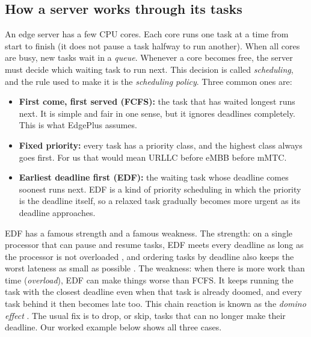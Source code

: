 \documentclass[11pt]{article}
\theoremstyle{definition}
\begin{document}
\subsection{How a server works through its tasks}
An edge server has a few CPU cores. Each core runs one task at a time from start to finish (it does not pause a
task halfway to run another). When all cores are busy, new tasks wait in a \emph{queue}. Whenever a core becomes
free, the server must decide which waiting task to run next. This decision is called \emph{scheduling}, and the
rule used to make it is the \emph{scheduling policy}. Three common ones are:
\begin{itemize}
\item \textbf{First come, first served (FCFS):} the task that has waited longest runs next. It is simple and
fair in one sense, but it ignores deadlines completely. This is what EdgePlus assumes.
\item \textbf{Fixed priority:} every task has a priority class, and the highest class always goes first. For us
that would mean URLLC before eMBB before mMTC.
\item \textbf{Earliest deadline first (EDF):} the waiting task whose deadline comes soonest runs next. EDF is a
kind of priority scheduling in which the priority is the deadline itself, so a relaxed task gradually becomes
more urgent as its deadline approaches.
\end{itemize}

EDF has a famous strength and a famous weakness. The strength: on a single processor that can pause and resume tasks, EDF
meets every deadline as long as the processor is not overloaded \cite{liu1973}, and ordering tasks by deadline also
keeps the worst lateness as small as possible \cite{jackson1955}. The weakness: when there is more work than time
(\emph{overload}), EDF can make things worse than FCFS. It keeps running the task with the closest deadline even
when that task is already doomed, and every task behind it then becomes late too. This chain reaction is known
as the \emph{domino effect} \cite{locke1986,buttazzo2011}. The usual fix is to drop, or skip, tasks that can no
longer make their deadline. Our worked example below shows all three cases.
\end{document}
